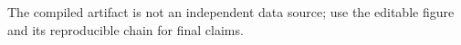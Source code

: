 The compiled artifact is not an independent data source; use the editable figure and its reproducible chain for final claims.
